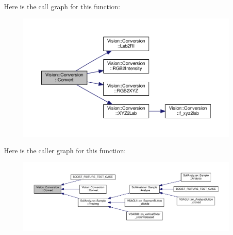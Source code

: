 Here is the call graph for this function\+:\nopagebreak
\begin{figure}[H]
\begin{center}
\leavevmode
\includegraphics[width=350pt]{class_vision_1_1_conversion_ac78b687a5b6cdf4c0ae812b5d76b13fc_cgraph}
\end{center}
\end{figure}




Here is the caller graph for this function\+:\nopagebreak
\begin{figure}[H]
\begin{center}
\leavevmode
\includegraphics[width=350pt]{class_vision_1_1_conversion_ac78b687a5b6cdf4c0ae812b5d76b13fc_icgraph}
\end{center}
\end{figure}


\hypertarget{class_vision_1_1_conversion_a7795d9d544e89e672acff2747b2218f0}{}
